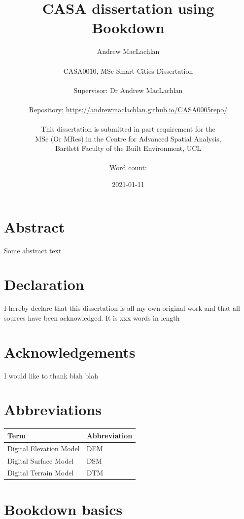 \documentclass[
  12pt,
  oneside]{book}
\title{CASA dissertation using Bookdown}
\author{Andrew MacLachlan\\
~\\
CASA0010, MSc Smart Cities Dissertation\\
~\\
Supervisor: Dr Andrew MacLachlan\\
~\\
Repository: \url{https://andrewmaclachlan.github.io/CASA0005repo/}\\
~\\
This dissertation is submitted in part requirement for the\\
MSc (Or MRes) in the Centre for Advanced Spatial Analysis,\\
Bartlett Faculty of the Built Environment, UCL\\
~\\
Word count:}
\date{2021-01-11}
\begin{document}
\maketitle


\hypertarget{abstract}{%
\chapter*{Abstract}\label{abstract}}

Some abstract text


\hypertarget{declaration}{%
\chapter*{Declaration}\label{declaration}}

I hereby declare that this dissertation is all my own original work and that all sources have been acknowledged. It is xxx words in length

\hypertarget{acknowledgements}{%
\chapter*{Acknowledgements}\label{acknowledgements}}

I would like to thank blah blah

\setcounter{tocdepth}{3}
\tableofcontents
\listoffigures
\listoftables

\hypertarget{abbreviations}{%
\chapter*{Abbreviations}\label{abbreviations}}

\begin{table}[H]
\centering
\begin{tabular}{ll}
\toprule
\textbf{Term} & \textbf{Abbreviation}\\
\midrule
Digital Elevation Model & DEM\\
Digital Surface Model & DSM\\
Digital Terrain Model & DTM\\
\bottomrule
\end{tabular}
\end{table}

\hypertarget{bookdown-basics}{%
\chapter{Bookdown basics}\label{bookdown-basics}}
\end{document}
